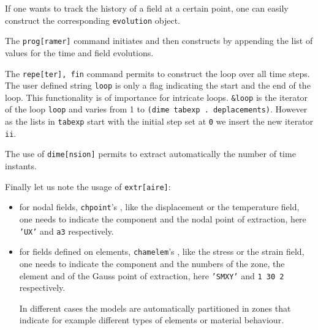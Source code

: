 \begin{castemcom}
If one wants to track the history  of a field at a certain 
point, one can easily construct the corresponding 
\texttt{evolution} object.

The \texttt{prog[ramer]} command initiates and then
constructs by appending the list of values for the time 
and field evolutions.   

The \texttt{repe[ter], fin} command permits to construct 
the loop over all time steps. The user defined  string  
\texttt{loop} is only a flag indicating the start and the 
end of the loop. This functionality is of importance for 
intricate loops. \texttt{\&loop} is the iterator of the 
loop \texttt{loop} and varies from 1 to 
\texttt{(dime tabexp . deplacements)}. However as 
the lists in \texttt{tabexp} start with the initial 
step set at \texttt{0} we insert the new iterator 
\texttt{ii}.

The use of \texttt{dime[nsion]} permits to extract  automatically  
the number of time instants.  

Finally let us note the usage of \texttt{extr[aire]}:
\begin{itemize}

   \item for nodal fields, \texttt{chpoint}'s , like the 
   displacement or the temperature field, one needs to indicate 
   the component and the nodal point of extraction, here 
   \texttt{'UX'} and \texttt{a3} respectively.    
   
   \item  for fields defined on elements, \texttt{chamelem}'s , 
   like the stress or the strain field, one needs to indicate 
   the component and the numbers of the zone, the element and of the Gauss point of 
   extraction, here \texttt{'SMXY'} and \texttt{1 30 2} respectively.    
   
   In different cases the models are automatically partitioned in zones
   that indicate for example different types of elements or 
   material behaviour.  

\end{itemize} 
 
 
\end{castemcom}

